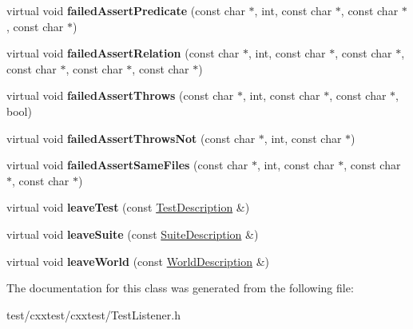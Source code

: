 \begin{DoxyCompactItemize}
\item 
\hypertarget{classCxxTest_1_1TestListener_a5e3002f8532e8b87356c1c18b1f0152e}{virtual void {\bfseries failed\-Assert\-Predicate} (const char $\ast$, int, const char $\ast$, const char $\ast$, const char $\ast$)}\label{classCxxTest_1_1TestListener_a5e3002f8532e8b87356c1c18b1f0152e}

\item 
\hypertarget{classCxxTest_1_1TestListener_ac55cecd6245ac7964047bb2fb731fb97}{virtual void {\bfseries failed\-Assert\-Relation} (const char $\ast$, int, const char $\ast$, const char $\ast$, const char $\ast$, const char $\ast$, const char $\ast$)}\label{classCxxTest_1_1TestListener_ac55cecd6245ac7964047bb2fb731fb97}

\item 
\hypertarget{classCxxTest_1_1TestListener_abdcf51240f5c04a983c049533a0eb39a}{virtual void {\bfseries failed\-Assert\-Throws} (const char $\ast$, int, const char $\ast$, const char $\ast$, bool)}\label{classCxxTest_1_1TestListener_abdcf51240f5c04a983c049533a0eb39a}

\item 
\hypertarget{classCxxTest_1_1TestListener_ab8b5e32dce3dadac5e8d318ebff7e26f}{virtual void {\bfseries failed\-Assert\-Throws\-Not} (const char $\ast$, int, const char $\ast$)}\label{classCxxTest_1_1TestListener_ab8b5e32dce3dadac5e8d318ebff7e26f}

\item 
\hypertarget{classCxxTest_1_1TestListener_ad3e25e04539c58ae4b1951f1d111835e}{virtual void {\bfseries failed\-Assert\-Same\-Files} (const char $\ast$, int, const char $\ast$, const char $\ast$, const char $\ast$)}\label{classCxxTest_1_1TestListener_ad3e25e04539c58ae4b1951f1d111835e}

\item 
\hypertarget{classCxxTest_1_1TestListener_a46b4a76c5f0feb378c6b058e90d1508e}{virtual void {\bfseries leave\-Test} (const \hyperlink{classCxxTest_1_1TestDescription}{Test\-Description} \&)}\label{classCxxTest_1_1TestListener_a46b4a76c5f0feb378c6b058e90d1508e}

\item 
\hypertarget{classCxxTest_1_1TestListener_aaac3ffc635abb616f7a2cd2cd460d265}{virtual void {\bfseries leave\-Suite} (const \hyperlink{classCxxTest_1_1SuiteDescription}{Suite\-Description} \&)}\label{classCxxTest_1_1TestListener_aaac3ffc635abb616f7a2cd2cd460d265}

\item 
\hypertarget{classCxxTest_1_1TestListener_a9fdc72862efba6b9505a53044cb6b996}{virtual void {\bfseries leave\-World} (const \hyperlink{classCxxTest_1_1WorldDescription}{World\-Description} \&)}\label{classCxxTest_1_1TestListener_a9fdc72862efba6b9505a53044cb6b996}

\end{DoxyCompactItemize}


The documentation for this class was generated from the following file\-:\begin{DoxyCompactItemize}
\item 
test/cxxtest/cxxtest/Test\-Listener.\-h\end{DoxyCompactItemize}
